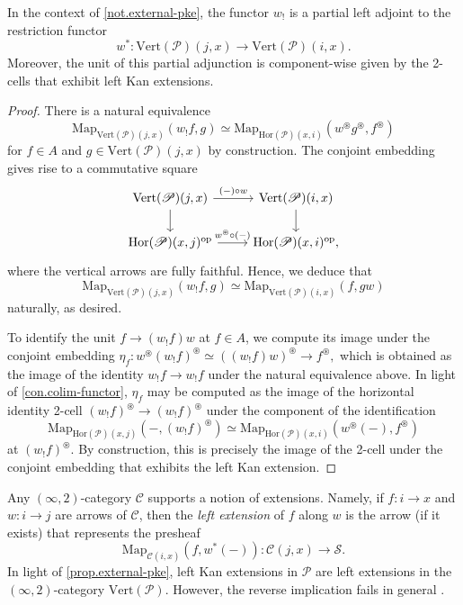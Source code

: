 \documentclass[a4paper, 11pt]{amsart}
\numberwithin{theorem}{section}
\theoremstyle{definition}
\newcommand{\op}{\mathrm{op}}
\newcommand{\map}{\mathrm{Map}}
\renewcommand{\S}{\mathscr{S}}
\newcommand{\C}{\mathscr{C}}
\renewcommand{\P}{\mathscr{P}}
\renewcommand{\Vert}{\mathrm{Vert}}
\newcommand{\Hor}{\mathrm{Hor}}
\begin{document}
\begin{proposition}\label{prop.external-pke}
	In the context of \cref{not.external-pke}, the functor $w_!$ is a partial left adjoint to the restriction functor 
	$$
	w^* : \Vert(\P)(j,x)\rightarrow \Vert(\P)(i,x).
	$$
	Moreover, the unit of this partial adjunction 
	is component-wise given by the 2-cells that exhibit left Kan extensions.
\end{proposition}
\begin{proof}
	There is a natural equivalence 
	$$
	\map_{\Vert(\P)(j,x)}(w_!f, g) \simeq \map_{\Hor(\P)(x,i)}(w^\circledast g^\circledast , f^\circledast)
	$$
	for $f\in A$ and $g \in \Vert(\P)(j,x)$ by construction. The conjoint embedding gives rise to a commutative square 
	\[
		\begin{tikzcd}
			\Vert(\P)(j,x) \arrow[r, "(-) \circ w"] \arrow[d] & \Vert(\P)(i,x) \arrow[d] \\
			\Hor(\P)(x,j)^\op \arrow[r, "w^\circledast \circ (-)"] & \Hor(\P)(x,i)^\op,
		\end{tikzcd}
	\]
	where the vertical arrows are fully faithful. Hence, we deduce that
	$$
	\map_{\Vert(\P)(j,x)}(w_!f, g) \simeq \map_{\Vert(\P)(i,x)}(f, gw)
	$$
	naturally, as desired.
	
	To identify the unit
	$
	f \rightarrow (w_!f)w
	$
	at $f\in A$,
	we compute its image under the conjoint embedding 
	$
	\eta_f : w^\circledast (w_!f)^\circledast \simeq ((w_!f)w)^\circledast \rightarrow f^\circledast,
	$
	which is obtained as the image of the identity $w_!f \rightarrow w_!f$ under the natural equivalence above. In light of \cref{con.colim-functor}, 
	$\eta_f$ may be computed as the image of the horizontal identity 2-cell $(w_!f)^\circledast \rightarrow (w_!f)^\circledast$ under the component 
	of the identification
	$$
	\map_{\Hor(\P)(x,j)}(-, (w_!f)^\circledast) \simeq \map_{\Hor(\P)(x,i)}(w^\circledast (-), f^\circledast)
	$$
	at $(w_!f)^\circledast$. By construction, 
	this is precisely the image of the 2-cell under the conjoint embedding that exhibits the left Kan extension.
\end{proof}


\begin{remark}\label{rem.wke}
	Any $(\infty,2)$-category $\C$ supports a notion of extensions. Namely, if $f : i \rightarrow x$ and $w : i \rightarrow j$ are 
	arrows of  $\C$, then the \textit{left extension} of $f$ along $w$ 
	is the arrow (if it exists) that represents the presheaf 
	$$
	\map_{\C(i,x)}(f, w^*(-)) : \C(j,x) \rightarrow  \S.
	$$
	In light of \cref{prop.external-pke}, left Kan extensions in $\P$ are left extensions in the $(\infty,2)$-category $\Vert(\P)$. However, 
	the reverse implication fails in general \cite{CampionCounterEx}.
\end{remark}
\end{document}
